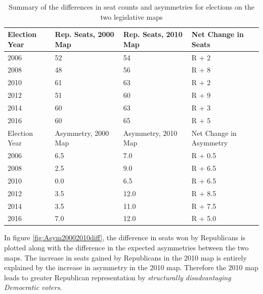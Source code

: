 \documentclass[preprint,12pt]{article}
\begin{document}
\begin{table}[htb!]
\centering
\caption{Summary of the differences in seat counts and asymmetries for elections on the two legislative maps \label{tab:seats}}
\begin{tabular}{|l|l|l|l|}
\hline
Election Year & Rep. Seats, 2000 Map & Rep. Seats, 2010 Map & Net Change in Seats\\
\hline
\hline
2006 & 52 & 54 & R + 2\\
\hline
2008 & 48 & 56 & R + 8\\
\hline
2010 & 61 & 63 & R + 2\\
\hline
2012 & 51 & 60 & R + 9\\
\hline
2014 & 60 & 63 & R + 3\\
\hline
2016 & 60 & 65 & R + 5\\
\hline
\hline
Election Year & Asymmetry, 2000 Map & Asymmetry, 2010 Map & Net Change in Asymmetry\\
\hline
\hline
2006 & 6.5 & 7.0 & R + 0.5\\
\hline
2008 & 2.5 & 9.0 & R + 6.5\\
\hline
2010 & 0.0 & 6.5 & R + 6.5\\
\hline
2012 & 3.5 & 12.0 & R + 8.5\\
\hline
2014 & 3.5 & 11.0 & R + 7.5\\
\hline
2016 & 7.0 & 12.0 & R + 5.0\\
\hline
\end{tabular}
\end{table}


In figure \ref{fig:Asym20002010diff}, the difference in seats won by Republicans is plotted along with the difference in the expected asymmetries between the two maps.
The increase in seats gained by Republicans in the 2010 map is entirely explained by the increase in asymmetry in the 2010 map.
Therefore the 2010 map leads to greater Republican representation by \emph{structurally disadvantaging Democratic voters}.
\end{document}
